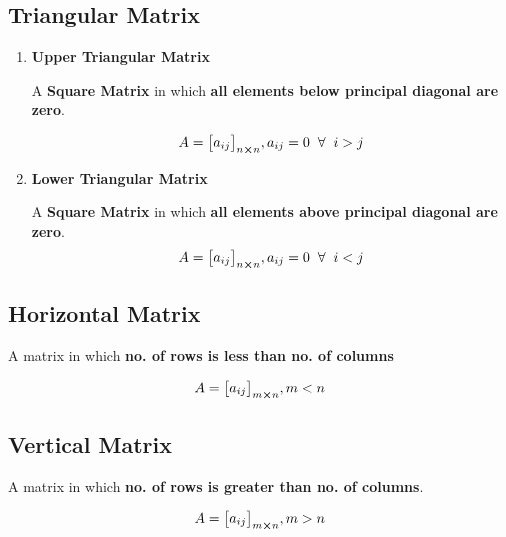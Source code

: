 \documentclass{article}
\begin{document}
\subsection{Triangular Matrix}

\begin{enumerate}
    \item \textbf{Upper Triangular Matrix}

          A \textbf{Square Matrix} in which \textbf{all elements below principal diagonal are zero}.

          $$A={\begin{bmatrix}
                  a_{ij}
              \end{bmatrix}}_{n \cross n}, a_{ij}=0 \hspace{2mm} \forall \hspace{2mm} i >j $$

    \item \textbf{Lower Triangular Matrix}

          A \textbf{Square Matrix} in which \textbf{all elements above principal diagonal are zero}.
          $$A={\begin{bmatrix}
                  a_{ij}
              \end{bmatrix}}_{n \cross n}, a_{ij}=0 \hspace{2mm} \forall \hspace{2mm} i<j $$
\end{enumerate}

\subsection{Horizontal Matrix}

A matrix in which \textbf{no. of rows is less than no. of columns}

$$A={\begin{bmatrix}
        a_{ij}
    \end{bmatrix}}_{m \cross n}, m <n  $$

\subsection{Vertical Matrix}

A matrix in which \textbf{no. of rows is greater than no. of columns}.

$$A={\begin{bmatrix}
        a_{ij}
    \end{bmatrix}}_{m \cross n}, m>n $$
\end{document}
